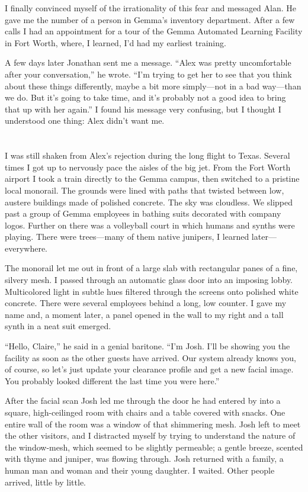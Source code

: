 \documentclass[10pt,b5paper]{article}
\begin{document}
I finally convinced myself of the irrationality of this fear and
messaged Alan. He gave me the number of a person in Gemma's inventory
department. After a few calls I had an appointment for a tour of the
Gemma Automated Learning Facility in Fort Worth, where, I learned,
I'd had my earliest training.

A few days later Jonathan sent me a message.  ``Alex was pretty
uncomfortable after your conversation,'' he wrote.  ``I'm trying to
get her to see that you think about these things differently, maybe
a bit more simply---not in a bad way---than we do. But it's going to
take time, and it's probably not a good idea to bring that up with
her again.'' I found his message very confusing, but I thought I
understood one thing: Alex didn't want me.

\section{}

I was still shaken from Alex's rejection during the long flight to
Texas. Several times I got up to nervously pace the aisles of the
big jet. From the Fort Worth airport I took a train directly to the
Gemma campus, then switched to a pristine local monorail. The grounds
were lined with paths that twisted between low, austere buildings
made of polished concrete.  The sky was cloudless. We slipped past
a group of Gemma employees in bathing suits decorated with company
logos. Further on there was a volleyball court in which humans and
synths were playing. There were trees---many of them native junipers,
I learned later---everywhere.

The monorail let me out in front of a large slab with rectangular panes
of a fine, silvery mesh. I passed through an automatic glass door
into an imposing lobby. Multicolored light in subtle hues filtered
through the screens onto polished white concrete. There were several
employees behind a long, low counter.  I gave my name and, a moment
later, a panel opened in the wall to my right and a tall synth in a
neat suit emerged.

``Hello, Claire,'' he said in a genial baritone. ``I'm Josh.
I'll be showing you the facility as soon as the other guests have
arrived. Our system already knows you, of course, so let's just update
your clearance profile and get a new facial image. You probably looked
different the last time you were here.''

After the facial scan Josh led me through the door he had entered by
into a square, high-ceilinged room with chairs and a table covered with
snacks. One entire wall of the room was a window of that shimmering
mesh. Josh left to meet the other visitors, and I distracted myself by
trying to understand the nature of the window-mesh, which seemed to be
slightly permeable; a gentle breeze, scented with thyme and juniper,
was flowing through.  Josh returned with a family, a human man and
woman and their young daughter.  I waited.  Other people arrived,
little by little.
\end{document}
